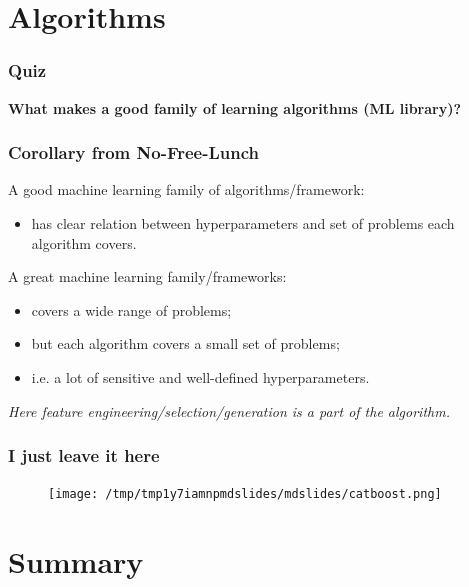 \documentclass[mathserif, aspectratio=43]{beamer}
\begin{document}
\section{Algorithms}



\begin{frame}[fragile]
\frametitle{Quiz}
\begin{center}
\textbf{ \Large What makes a good family of learning algorithms (ML library)?}
\end{center}

\end{frame}


\begin{frame}[fragile]
\frametitle{Corollary from No-Free-Lunch}
\vspace*{5mm}
A good machine learning family of algorithms/framework:
\begin{itemize}
\item has clear relation between hyperparameters and set of problems each algorithm covers.
\end{itemize}
\vspace{5mm}
A great machine learning family/frameworks:
\begin{itemize}
\item covers a wide range of problems;
\item but each algorithm covers a small set of problems;
\item i.e. a lot of sensitive and well-defined hyperparameters.
\end{itemize}
\vspace{5mm}
\textit{Here feature engineering/selection/generation is a part of the algorithm.}

\end{frame}


\begin{frame}[fragile]
\frametitle{I just leave it here}
\begin{figure}
\centering
\texttt{[image: /tmp/tmp1y7iamnpmdslides/mdslides/catboost.png]}

\end{figure}


\end{frame}


\section{Summary}
\end{document}
